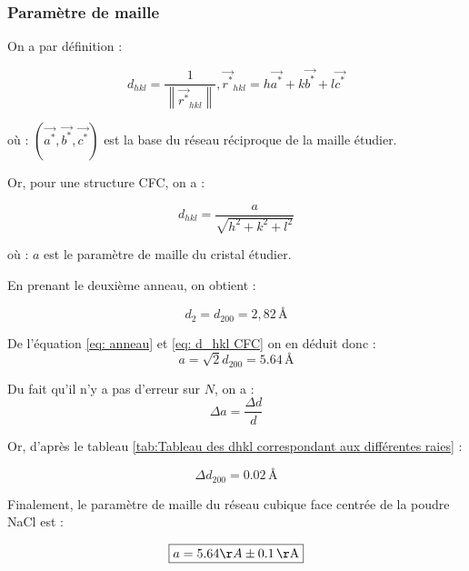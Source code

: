 \subsubsection{Paramètre de maille}
\begin{flushleft}
	On a par définition :
	
	\begin{equation}
		d_{hkl} = \frac{1}{\left\| \vec{r^*}_{hkl}^{}  \right\|} , \vec{r^*}_{hkl} = h\vec{a^*} + k\vec{b^*} + l\vec{c^*}
	\end{equation}
	
	où : $(\vec{a^*},\vec{b^*},\vec{c^*})$ est la base du réseau réciproque de la maille étudier.
	
	Or, pour une structure CFC, on a : 
	
	\begin{equation}\label{eq: d_hkl CFC}
		d_{hkl} = \frac{a}{\sqrt{h^2+ k^2 +l^2 }}
	\end{equation} 
	
	où : $a$ est le paramètre de maille du cristal étudier.


\vspace{0.2cm}
	En prenant le deuxième anneau, on obtient :
	
\begin{equation} \label{eq: anneau}
	d_2 = d_{200} = 2,82 \, \text{\AA}
\end{equation}	

De l'équation \ref{eq: anneau} et \ref{eq: d_hkl CFC} on en déduit donc :
\begin{equation}
		 a = \sqrt{2}d_{200}  = 5.64 \, \text{\AA}
\end{equation}


	
	Du fait qu'il n'y a pas d'erreur sur $N$, on a :
	\begin{equation}
			 \Delta a = \frac{\Delta d}{d}
	\end{equation}

	
Or,	d'après le tableau \ref{tab:Tableau des dhkl correspondant aux différentes raies} : 
	
	\begin{equation}
		\Delta d_{200} = 0.02 \, \text{\AA} 
	\end{equation} 
	
Finalement, le paramètre de maille du réseau cubique face centrée de la poudre NaCl est :

\begin{equation}
 \boxed{a = 5.64 \AA \pm 0.1 \, \text{\AA}}	
\end{equation} 
	
\end{flushleft}
